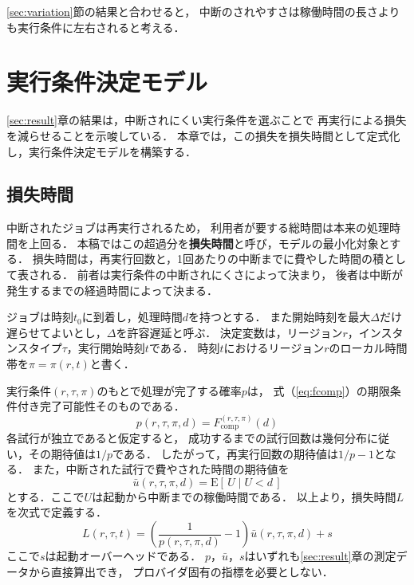 \documentclass[submit,techrep,noauthor]{ipsj}
\newcommand{\Fcomp}{F_{\mathrm{comp}}}
\begin{document}
\ref{sec:variation}節の結果と合わせると，
中断のされやすさは稼働時間の長さよりも実行条件に左右されると考える．


\section{実行条件決定モデル}
\label{sec:model}

\ref{sec:result}章の結果は，中断されにくい実行条件を選ぶことで
再実行による損失を減らせることを示唆している．
本章では，この損失を損失時間として定式化し，実行条件決定モデルを構築する．

\subsection{損失時間}

中断されたジョブは再実行されるため，
利用者が要する総時間は本来の処理時間を上回る．
本稿ではこの超過分を\textbf{損失時間}と呼び，モデルの最小化対象とする．
損失時間は，再実行回数と，1回あたりの中断までに費やした時間の積として表される．
前者は実行条件の中断されにくさによって決まり，
後者は中断が発生するまでの経過時間によって決まる．

ジョブは時刻$t_0$に到着し，処理時間$d$を持つとする．
また開始時刻を最大$\Delta$だけ遅らせてよいとし，$\Delta$を許容遅延と呼ぶ．
決定変数は，リージョン$r$，インスタンスタイプ$\tau$，実行開始時刻$t$である．
時刻$t$におけるリージョン$r$のローカル時間帯を$\pi=\pi(r,t)$と書く．

実行条件$(r,\tau,\pi)$のもとで処理が完了する確率$p$は，
式（\ref{eq:fcomp}）の期限条件付き完了可能性そのものである．
\begin{equation}
p(r,\tau,\pi,d) = \Fcomp^{(r,\tau,\pi)}(d)
\end{equation}
各試行が独立であると仮定すると，
成功するまでの試行回数は幾何分布に従い，その期待値は$1/p$である．
したがって，再実行回数の期待値は$1/p-1$となる．
また，中断された試行で費やされた時間の期待値を
\begin{equation}
\bar{u}(r,\tau,\pi,d) = \mathrm{E}\left[\,U \mid U<d\,\right]
\end{equation}
とする．ここで$U$は起動から中断までの稼働時間である．
以上より，損失時間$L$を次式で定義する．
\begin{equation}
L(r,\tau,t) = \left(\frac{1}{p(r,\tau,\pi,d)}-1\right)\bar{u}(r,\tau,\pi,d) + s
\label{eq:loss}
\end{equation}
ここで$s$は起動オーバーヘッドである．
$p$，$\bar{u}$，$s$はいずれも\ref{sec:result}章の測定データから直接算出でき，
プロバイダ固有の指標を必要としない．
\end{document}
